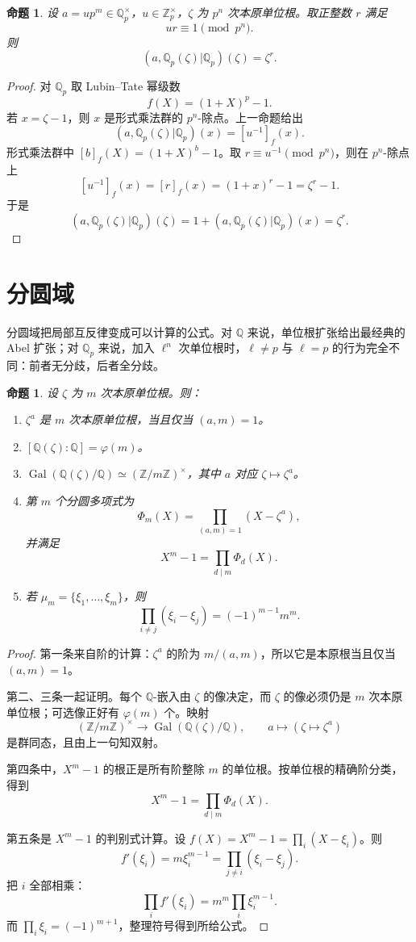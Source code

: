 \documentclass[11pt,a4paper,openany]{ctexbook}
\numberwithin{equation}{chapter}
\newcommand{\Q}{\mathbb{Q}}
\newcommand{\Z}{\mathbb{Z}}
\newcommand{\Gal}{\operatorname{Gal}}
\theoremstyle{plain}
\newtheorem{proposition}[theorem]{命题}
\theoremstyle{definition}
\theoremstyle{remark}
\begin{document}
\begin{proposition}
设 $a=up^m\in\Q_p^\times$，$u\in\Z_p^\times$，$\zeta$ 为 $p^n$ 次本原单位根。取正整数 $r$ 满足
\[
ur\equiv1\pmod{p^n}.
\]
则
\[
(a,\Q_p(\zeta)|\Q_p)(\zeta)=\zeta^r.
\]
\end{proposition}

\begin{proof}
对 $\Q_p$ 取 Lubin--Tate 幂级数
\[
f(X)=(1+X)^p-1.
\]
若 $x=\zeta-1$，则 $x$ 是形式乘法群的 $p^n$-除点。上一命题给出
\[
(a,\Q_p(\zeta)|\Q_p)(x)=[u^{-1}]_f(x).
\]
形式乘法群中 $[b]_f(X)=(1+X)^b-1$。取 $r\equiv u^{-1}\pmod{p^n}$，则在 $p^n$-除点上
\[
[u^{-1}]_f(x)=[r]_f(x)=(1+x)^r-1=\zeta^r-1.
\]
于是
\[
(a,\Q_p(\zeta)|\Q_p)(\zeta)
=1+(a,\Q_p(\zeta)|\Q_p)(x)
=\zeta^r.
\]
\end{proof}

\section{分圆域}

分圆域把局部互反律变成可以计算的公式。对 $\Q$ 来说，单位根扩张给出最经典的 Abel 扩张；对 $\Q_p$ 来说，加入 $\ell^n$ 次单位根时，$\ell\ne p$ 与 $\ell=p$ 的行为完全不同：前者无分歧，后者全分歧。

\begin{proposition}
设 $\zeta$ 为 $m$ 次本原单位根。则：
\begin{enumerate}
\item $\zeta^a$ 是 $m$ 次本原单位根，当且仅当 $(a,m)=1$。
\item $[\Q(\zeta):\Q]=\varphi(m)$。
\item $\Gal(\Q(\zeta)/\Q)\simeq(\Z/m\Z)^\times$，其中 $a$ 对应 $\zeta\mapsto\zeta^a$。
\item 第 $m$ 个分圆多项式为
\[
\Phi_m(X)=\prod_{(a,m)=1}(X-\zeta^a),
\]
并满足
\[
X^m-1=\prod_{d\mid m}\Phi_d(X).
\]
\item 若 $\mu_m=\{\xi_1,\dots,\xi_m\}$，则
\[
\prod_{i\ne j}(\xi_i-\xi_j)=(-1)^{m-1}m^m.
\]
\end{enumerate}
\end{proposition}

\begin{proof}
第一条来自阶的计算：$\zeta^a$ 的阶为 $m/(a,m)$，所以它是本原根当且仅当 $(a,m)=1$。

第二、三条一起证明。每个 $\Q$-嵌入由 $\zeta$ 的像决定，而 $\zeta$ 的像必须仍是 $m$ 次本原单位根；可选像正好有 $\varphi(m)$ 个。映射
\[
(\Z/m\Z)^\times\to\Gal(\Q(\zeta)/\Q),\qquad a\mapsto(\zeta\mapsto\zeta^a)
\]
是群同态，且由上一句知双射。

第四条中，$X^m-1$ 的根正是所有阶整除 $m$ 的单位根。按单位根的精确阶分类，得到
\[
X^m-1=\prod_{d\mid m}\Phi_d(X).
\]

第五条是 $X^m-1$ 的判别式计算。设 $f(X)=X^m-1=\prod_i(X-\xi_i)$。则
\[
f'(\xi_i)=m\xi_i^{m-1}=\prod_{j\ne i}(\xi_i-\xi_j).
\]
把 $i$ 全部相乘：
\[
\prod_i f'(\xi_i)=m^m\prod_i\xi_i^{m-1}.
\]
而 $\prod_i\xi_i=(-1)^{m+1}$，整理符号得到所给公式。
\end{proof}
\end{document}
